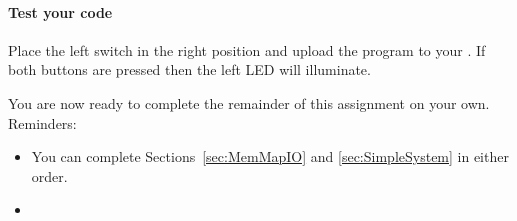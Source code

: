 \paragraph{Test your code}

Place the left switch in the right position and upload the program to your \developmentboard.
If both buttons are pressed then the left LED will illuminate.


\vspace{1cm}

You are now ready to complete the remainder of this assignment on your own.
Reminders:
\begin{itemize}
    \item You can complete Sections~\ref{sec:MemMapIO} and \ref{sec:SimpleSystem} in either order.
    \item \collaborationrules
\end{itemize}
